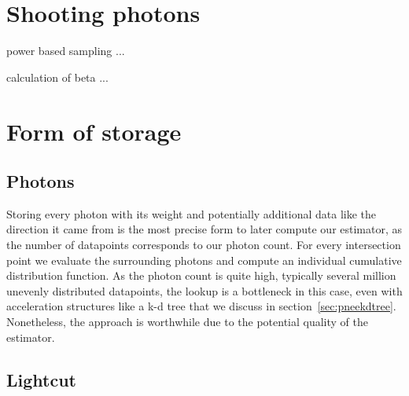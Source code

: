 
\section{Shooting photons}

power based sampling ...

calculation of beta ...


\section{Form of storage}

\subsection{Photons}

Storing every photon with its weight and potentially additional data like the direction it came from is the most precise form to later compute our estimator, as the number of datapoints corresponds to our photon count. For every intersection point we evaluate the surrounding photons and compute an individual cumulative distribution function. As the photon count is quite high, typically several million unevenly distributed datapoints, the lookup is a bottleneck in this case, even with acceleration structures like a k-d tree that we discuss in section~\ref{sec:pneekdtree}. Nonetheless, the approach is worthwhile due to the potential quality of the estimator.

\subsection{Lightcut}

